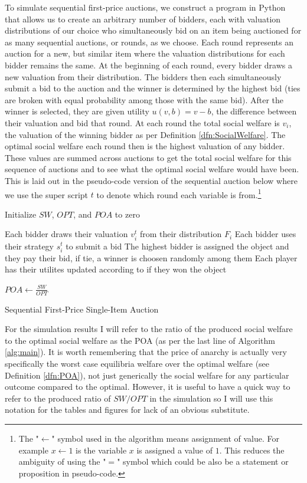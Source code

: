 \documentclass[12pt,twoside]{reedthesis}
\begin{document}
To simulate sequential first-price auctions, we construct a program in Python that allows us to create an arbitrary number of bidders, each with valuation distributions of our choice who simultaneously bid on an item being auctioned for as many sequential auctions, or rounds, as we choose. Each round represents an auction for a new, but similar item where the valuation distributions for each bidder remains the same. At the beginning of each round, every bidder draws a new valuation from their distribution. The bidders then each simultaneously submit a bid to the auction and the winner is determined by the highest bid (ties are broken with equal probability among those with the same bid). After the winner is selected, they are given utility $u(v, b) = v - b$, the difference between their valuation and bid that round. At each round the total social welfare is $v_i$, the valuation of the winning bidder as per Definition \ref{dfn:SocialWelfare}. The optimal social welfare each round then is the highest valuation of any bidder. These values are summed across auctions to get the total social welfare for this sequence of auctions and to see what the optimal social welfare would have been. This is laid out in the pseudo-code version of the sequential auction below where we use the super script $t$ to denote which round each variable is from.\footnote{The "$\leftarrow$" symbol used in the algorithm means assignment of value. For example $x \leftarrow 1$ is the variable $x$ is assigned a value of $1$. This reduces the ambiguity of using the "$=$" symbol which could be also be a statement or proposition in pseudo-code.}\\

\begin{algorithm}[H]
	Initialize $SW$, $OPT$, and $POA$ to zero\\
	{
		Each bidder draws their valuation $v^t_i$ from their distribution $F_i$\;
		Each bidder uses their strategy $s^t_i$ to submit a bid\;
		The highest bidder is assigned the object and they pay their bid, if tie, a winner is choosen randomly among them\;
		Each player has their utilites updated according to if they won the object\;
	
		$POA \leftarrow \frac{SW}{OPT}$	
	}
\caption{Sequential First-Price Single-Item Auction}
\label{alg:main}
\end{algorithm}
\vspace{0.5cm}
For the simulation results I will refer to the ratio of the produced social welfare to the optimal social welfare as the POA (as per the last line of Algorithm \ref{alg:main}). It is worth remembering that the price of anarchy is actually very specifically the worst case equilibria welfare over the optimal welfare (see Definition \ref{dfn:POA}), not just generically the social welfare for any particular outcome compared to the optimal. However, it is useful to have a quick way to refer to the produced ratio of $SW/OPT$ in the simulation so I will use this notation for the tables and figures for lack of an obvious substitute.
\end{document}
